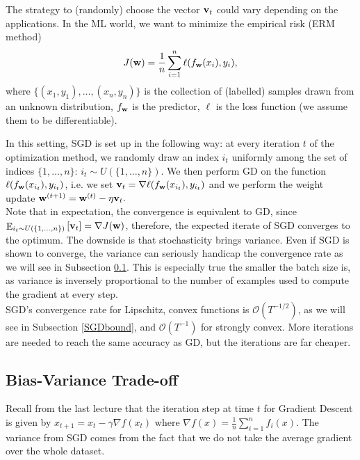 \documentclass{article}
\begin{document}
The strategy to (randomly) choose the vector ${\bf v}_t$ could vary depending on the applications. In the ML world, we want to minimize the empirical risk (ERM method)
$$J({\bf w}) = \dfrac{1}{n} \sum_{i=1}^n \ell(f_{{\bf w}}(x_i),y_i),$$
where $\{(x_1,y_1), \ldots, (x_n,y_n)\}$ is the collection of (labelled) samples drawn from an unknown distribution, $f_{\bf w}$ is the predictor, $\ell$ is the loss function (we assume them to be differentiable).

\vspace{2ex}

In this setting, SGD is set up in the following way: at every iteration $t$ of the optimization method, we randomly draw an index $i_t$ uniformly among the set of indices $\{1, \ldots, n\}$: $i_t \sim U(\{1, \ldots, n\})$. We then perform GD on the function $\ell(f_{\bf w}(x_{i_t}),y_{i_t})$, i.e. we set ${\bf v}_t = \nabla \ell (f_{\bf w}(x_{i_t}),y_{i_t}) $
and we perform the weight update ${\bf w}^{(t+1)} = {\bf w}^{(t)} -\eta {\bf v}_t.$
\\


Note that in expectation, the convergence is equivalent to GD, since $\mathop{\mathbb{E}}_{i_t \sim U(\{1, ..., n\})} \left [{\bf v}_{t} \right ] = \nabla J({\bf w})$, therefore, the expected iterate of SGD converges to the optimum. The downside is that stochasticity brings variance. Even if SGD is shown to converge, the variance can seriously handicap the convergence rate as we will see in Subsection \ref{BVtradeoff}. This is especially true the smaller the batch size is, as variance is inversely proportional to the number of examples used to compute the gradient at every step.\\

SGD's convergence rate for Lipschitz, convex functions is $\mathcal{O}(T^{-1/2})$, as we will see in Subsection \ref{SGDbound}, and $\mathcal{O}(T^{-1})$ for strongly convex. More iterations are needed to reach the same accuracy as GD, but the iterations are far cheaper.

\subsection{Bias-Variance Trade-off}\label{BVtradeoff}

Recall from the last lecture that the iteration step at time $t$ for Gradient Descent is given by $x_{t+1} = x_{t} - \gamma \nabla f(x_t)$ where $\nabla f(x) = \frac{1}{n}\sum_{i=1}^{n}f_i(x)$. The variance from SGD comes from the fact that we do not take the average gradient over the whole dataset.\\
\end{document}
